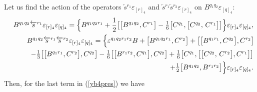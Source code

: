 \documentclass[10pt]{article}
\begin{document}
  Let us find the action of the operators  $\overleftarrow{s}{}^{r_1}\varepsilon_{[r]_4}$ and $\overleftarrow{s}{}^{r_1}\overleftarrow{s}{}^{r_2}\varepsilon_{[r]_4}$  on $B^{q_1q_2}\varepsilon_{[q]_4}$:
\begin{eqnarray}
&& B^{q_1q_2} \overleftarrow{s}{}^{r_1}\varepsilon_{[r]_4}\varepsilon_{[q]_4} =    \Big\{B^{q_1q_2r_1}+ \frac{1}{2}\big[\big[B^{q_1q_2},C^{r_1}\big] -\textstyle\frac{1}{6}\big[C^{q_1},\big[C^{q_2},\,C^{r_1}\big]\big]  \Big\}\varepsilon_{[r]_4}\varepsilon_{[q]_4}, \label{Bqqs1}\\
&& B^{q_1q_2} \overleftarrow{s}{}^{r_1}\overleftarrow{s}{}^{r_2}\varepsilon_{[r]_4}\varepsilon_{[q]_4} =    \Big\{\varepsilon^{q_1q_2r_1r_2}{B}+\big[B^{q_1q_2r_1},C^{r_2}\big]+\big[\big[B^{q_1r_1},C^{q_2}\big],C^{r_2}\big]\hspace{-0.1em} \nonumber \\
&& \quad  -\textstyle\frac{1}{3}\big[\big[B^{q_1r_1},C^{r_2}\big],C^{q_2}\big]- \textstyle\frac{1}{6}\big[\big[B^{r_1r_2},C^{q_1}\big],C^{q_2}\big]
+\textstyle\frac{1}{6}\big[C^{q_1},\big[\big[C^{q_2},\,C^{r_2}\big] , C^{r_1}\big]\big]\nonumber \\
&& \quad  +
 \textstyle\frac{1}{2}
\big[B^{q_1q_2}, B^{r_1r_2}\big] \Big\}\varepsilon_{[r]_4}\varepsilon_{[q]_4}. \label{Bqqs12}
\end{eqnarray}
Then, for the  last term in (\ref{yb4pres}) we have
\end{document}

